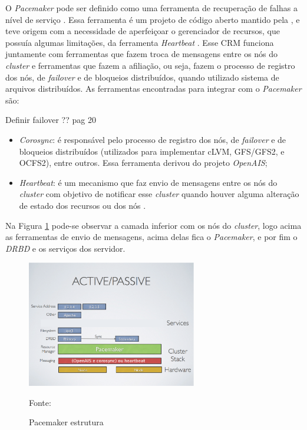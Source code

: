 O \textit{Pacemaker} \cite{pacemaker} pode ser definido como uma ferramenta de recuperação de falhas a nível de serviço \cite{perkov2011}. 
Essa ferramenta é um projeto de código aberto mantido pela \cite{clusterlabs}, e teve origem com a necessidade de aperfeiçoar o gerenciador 
de recursos, que possuía algumas limitações, da ferramenta \textit{Heartbeat} \cite{heartbeat}. Esse \ac{CRM} funciona juntamente com ferramentas
que fazem troca de mensagens entre os nós do \textit{cluster} e ferramentas que fazem a afiliação, ou seja, fazem o processo de registro dos
nós, de \textit{failover} e de bloqueios distribuídos, quando utilizado sistema de arquivos distribuídos. 
As ferramentas encontradas para integrar com o \textit{Pacemaker} são:

Definir failover ??
\cite{bassan2008} pag 20

\begin{itemize}
 \item \textit{Corosync}: é responsável pelo processo de registro dos nós, de \textit{failover} e de bloqueios distribuídos (utilizados para 
 implementar cLVM, GFS/GFS2, e OCFS2), entre outros. Essa ferramenta derivou do projeto \textit{OpenAIS};
 \item \textit{Heartbeat}: é um mecanismo que faz envio de mensagens entre os nós do \textit{cluster} com objetivo de notificar esse 
 \textit{cluster} quando houver alguma alteração de estado dos recursos ou dos nós \cite{clusterlabs}.
\end{itemize}

\newpage
Na Figura \ref{fig:pacemaker_tools} pode-se observar a camada inferior com os nós do \textit{cluster}, logo acima as ferramentas de envio de 
mensagens, acima delas fica o \textit{Pacemaker}, e por fim o \textit{DRBD} e os serviços dos servidor.

\begin{figure}[h!]
 \centering
 \includegraphics[width=280px]{img/pacemaker_tools.eps}
 \caption{Pacemaker estrutura}
 Fonte: \citet{pacemaker}
 \label{fig:pacemaker_tools}
\end{figure}

